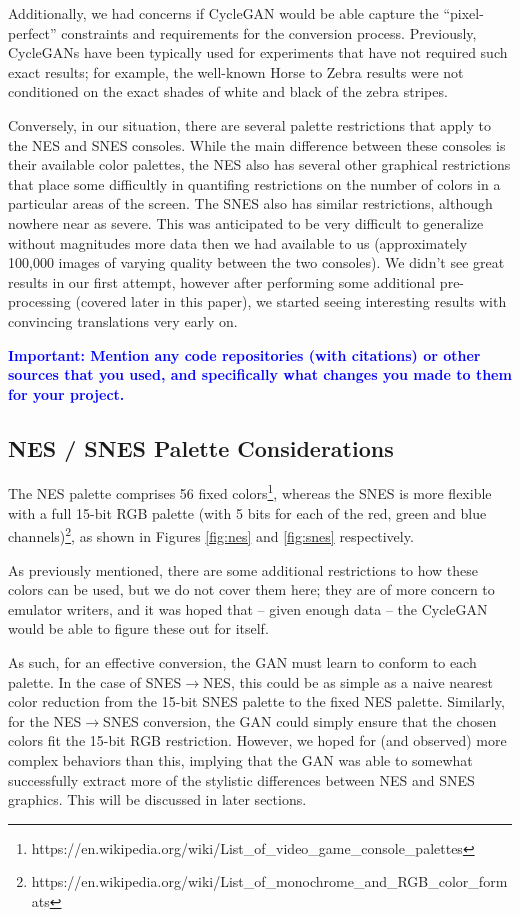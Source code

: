 \documentclass[10pt,twocolumn,letterpaper]{article}
\begin{document}
Additionally, we had concerns if CycleGAN would be able capture the ``pixel-perfect'' constraints and requirements for the conversion process. Previously, CycleGANs have been typically used for experiments that have not required such exact results; for example, the well-known Horse to Zebra results were not conditioned on the exact shades of white and black of the zebra stripes.

Conversely, in our situation, there are several palette restrictions that apply to the NES and SNES consoles. While the main difference between these consoles is their available color palettes, the NES also has several other graphical restrictions that place some difficultly in quantifing restrictions on the number of colors in a particular areas of the screen. The SNES also has similar restrictions, although nowhere near as severe. This was anticipated to be very difficult to generalize without magnitudes more data then we had available to us (approximately 100,000 images of varying quality between the two consoles). We didn't see great results in our first attempt, however after performing some additional pre-processing (covered later in this paper), we started seeing interesting results with convincing translations very early on.

\textbf{\textcolor{blue}{Important: Mention any code repositories (with citations) or other sources that you used, and specifically what changes you made to them for your project.}}

\subsection{NES / SNES Palette Considerations}
The NES palette comprises 56 fixed colors\footnote{https://en.wikipedia.org/wiki/List\_of\_video\_game\_console\_palettes}, whereas the SNES is more flexible with a full 15-bit RGB palette (with 5 bits for each of the red, green and blue channels)\footnote{https://en.wikipedia.org/wiki/List\_of\_monochrome\_and\_RGB\_color\_formats}, as shown in Figures \ref{fig:nes} and \ref{fig:snes} respectively.

As previously mentioned, there are some additional restrictions to how these colors can be used, but we do not cover them here; they are of more concern to emulator writers, and it was hoped that \--- given enough data \--- the CycleGAN would be able to figure these out for itself.

As such, for an effective conversion, the GAN must learn to conform to each palette. In the case of SNES${\rightarrow}$NES, this could be as simple as a naive nearest color reduction from the 15-bit SNES palette to the fixed NES palette. Similarly, for the NES${\rightarrow}$SNES conversion, the GAN could simply ensure that the chosen colors fit the 15-bit RGB restriction. However, we hoped for (and observed) more complex behaviors than this, implying that the GAN was able to somewhat successfully extract more of the stylistic differences between NES and SNES graphics. This will be discussed in later sections.
\end{document}
